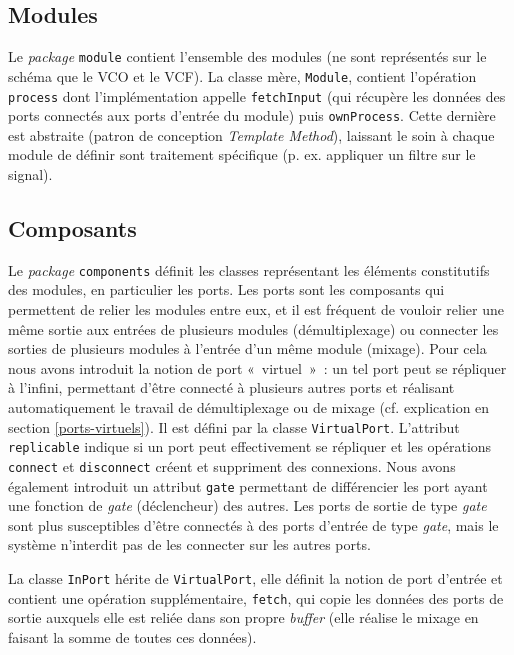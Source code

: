 \subsection{Modules}

Le \emph{package} \verb!module! contient l'ensemble des modules (ne
sont représentés sur le schéma que le VCO et le VCF). La classe
mère, \verb!Module!, contient l'opération \verb!process! dont
l'implémentation appelle \verb!fetchInput! (qui récupère les données des ports connectés aux ports d’entrée du module) puis \verb!ownProcess!.
Cette dernière est abstraite (patron de conception
\emph{Template Method}), laissant le soin à chaque module de
définir sont traitement spécifique (p. ex. appliquer un filtre sur le signal).

\subsection{Composants}

Le \emph{package} \verb!components! définit les classes
représentant les éléments constitutifs des modules, en particulier
les ports. Les ports sont les composants qui permettent de relier
les modules entre eux, et il est fréquent de vouloir relier une
même sortie aux entrées de plusieurs modules (démultiplexage) ou
connecter les sorties de plusieurs modules à l'entrée d'un même
module (mixage). Pour cela nous avons introduit la notion de port
«~virtuel~»~: un tel port peut se répliquer à l'infini, permettant
d'être connecté à plusieurs autres ports et réalisant
automatiquement le travail de démultiplexage ou de mixage (cf. explication en section \ref{ports-virtuels}). Il est
défini par la classe \verb!VirtualPort!. L'attribut
\verb!replicable! indique si un port peut effectivement se
répliquer et les opérations \verb!connect! et \verb!disconnect!
créent et suppriment des connexions. Nous avons également introduit
un attribut \verb!gate! permettant de différencier les port ayant
une fonction de \emph{gate} (déclencheur) des autres. Les ports de
sortie de type \emph{gate} sont plus susceptibles d'être connectés
à des ports d'entrée de type \emph{gate}, mais le système
n'interdit pas de les connecter sur les autres ports.

La classe \verb!InPort! hérite de \verb!VirtualPort!, elle définit
la notion de port d'entrée et contient une opération
supplémentaire, \verb!fetch!, qui copie les données des ports de
sortie auxquels elle est reliée dans son propre \emph{buffer} (elle
réalise le mixage en faisant la somme de toutes ces données).

